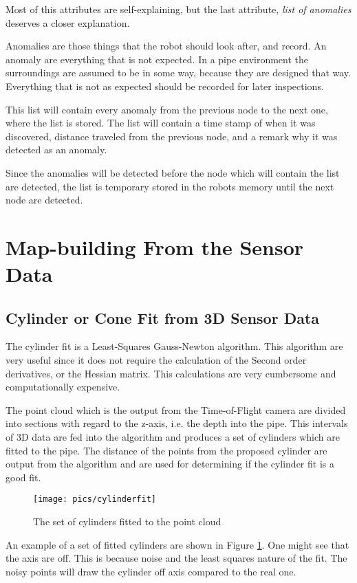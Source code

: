 Most of this attributes are self-explaining, but the last attribute, \emph{list of
anomalies} deserves a closer explanation. 

Anomalies are those things that the robot should look after, and record. An anomaly are
everything that is not expected. In a pipe environment the surroundings are assumed to be
in some way, because they are designed that way. Everything that is not as expected should
be recorded for later inspections. 

This list will contain every anomaly from the previous node to the next one, where the
list is stored. The list will contain a time stamp of when it was discovered, distance
traveled from the previous node, and a remark why it was detected as an anomaly. 

Since the anomalies will be detected before the node which will contain the list are
detected, the list is temporary stored in the robots memory until the next node are
detected. 


\section{Map-building From the Sensor Data}


\subsection{Cylinder or Cone Fit from 3D Sensor Data}
The cylinder fit is a Least-Squares Gauss-Newton algorithm. This algorithm are very
useful since it does not require the calculation of the Second order derivatives, or the
Hessian matrix. This calculations are very cumbersome and computationally expensive. 

The point cloud which is the output from the Time-of-Flight camera are divided into
sections with regard to the z-axis, i.e. the depth into the pipe. This intervals of 3D
data are fed into the algorithm and produces a set of cylinders which are fitted to the
pipe. The distance of the points from the proposed cylinder are output from the algorithm
and are used for determining if the cylinder fit is a good fit. 

\begin{figure}[htbp]
    \centering
    \texttt{[image: pics/cylinderfit]}
    \caption{The set of cylinders fitted to the point cloud}
    \label{chap5:fig-cylinderfit}
\end{figure}
An example of a set of fitted cylinders are shown in Figure \ref{chap5:fig-cylinderfit}.
One might see that the axis are off. This is because noise and the least squares nature of
the fit. The noisy points will draw the cylinder off axis compared to the real one. 



